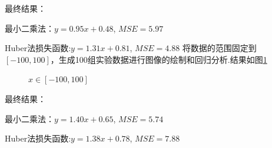 \documentclass[final]{cvpr}
\begin{document}
最终结果：\par
最小二乘法：$y = 0.95x+0.48$, $MSE = 5.97 $\par
Huber法损失函数:$y = 1.31x+0.81$, $MSE = 4.88 $
将数据的范围固定到$[-100,100]$，生成100组实验数据进行图像的绘制和回归分析.结果如图\ref{fig3}\par
\begin{figure}[htbp]
    \centering
    \centering
    \caption{$x \in [-100,100]$}
    \label{fig3}
    \end{figure}
最终结果：\par
最小二乘法：$y = 1.40x+0.65$, $MSE = 5.74 $\par
Huber法损失函数:$y = 1.38x+0.78$, $MSE = 7.88 $
\end{document}
